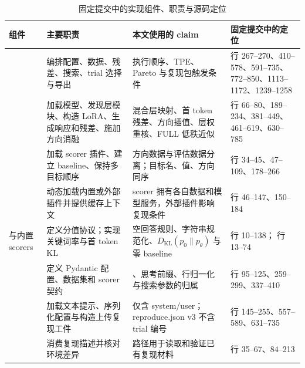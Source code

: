 \begin{table}[t]
  \caption{固定提交中的实现组件、职责与源码定位}
  \label{tab:components}
  \centering
  \scriptsize
  \begin{tabularx}{\textwidth}{@{}p{18mm}p{42mm}Yp{47mm}@{}}
    \toprule
    组件 & 主要职责 & 本文使用的 claim & 固定提交中的定位 \\
    \midrule
     & 编排配置、数据、残差、搜索、trial 选择与导出 & 执行顺序、TPE、Pareto 与复现包触发条件 & 行 267--270、410--578、591--735、772--850、1113--1172、1239--1258 \\
     & 加载模型、发现层模块、构造 LoRA、生成响应和残差、施加方向消融 & 混合层映射、首 token 残差、方向插值、层权重核、FULL 低秩近似 & 行 66--80、189--234、381--449、461--619、630--785 \\
     & 加载 scorer 插件、建立 baseline、保持多目标顺序 & 方向数据与评估数据分离；目标名、值、方向同序 & 行 34--45、47--109、178--266 \\
     & 动态加载内置或外部插件并提供缓存上下文 & scorer 拥有各自数据和模型服务，外部插件影响复现条件 & 行 46--147、150--184 \\
     与内置 scorers & 定义分值协议；实现关键词率与首 token KL & 空回答规则、字符串规范化、$D_{\mathrm{KL}}(p_0\|p_\theta)$ 与零 baseline &  行 10--138； 行 13--74 \\
     & 定义 Pydantic 配置、数据集和 scorer 契约 & 、思考前缀、行归一化与搜索参数的归属 & 行 95--125、259--299、337--410 \\
     & 加载文本提示、序列化配置与构造上传复现工件 &  仅含 system/user；reproduce.json v3 不含 trial 编号 & 行 145--255、557--589、631--735 \\
     & 消费复现描述并核对环境差异 &  路径用于读取和验证已有复现材料 & 行 35--67、84--213 \\
    \bottomrule
  \end{tabularx}
\end{table}
